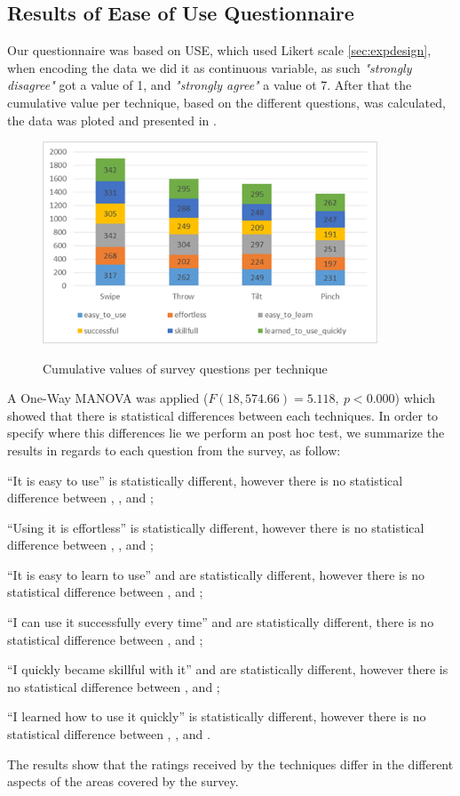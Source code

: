 \subsection{Results of Ease of Use Questionnaire}
Our questionnaire was based on USE, which used Likert scale \ref*{sec:expdesign}, when encoding the data we did it as continuous variable, as such \emph{"strongly disagree"} got a value of 1, and \emph{"strongly agree"} a value ot 7. After that the cumulative value per technique, based on the different questions, was calculated, the data was ploted and presented in . 
\begin{figure}[H]
	{\includegraphics[width = 1\columnwidth , height = 6cm ]{images/survey-data.png}} 
	\caption{
		Cumulative values of survey questions per technique
	}
	\label{fig:surveyResult}
\end{figure}

A One-Way MANOVA was applied ($F(18, 574.66)=5.118,\ p<0.000$) which showed that there is statistical differences between each techniques. 
In order to specify where this differences lie we perform an post hoc test, we summarize the results in regards to each question from the survey, as follow:
\begin{enumerate*}[label=\itshape\arabic*\upshape)]
	\item{``It is easy to use'' \swipe is statistically different, however there is no statistical difference between \throw, \tilt, and \pinch;}
	\item{``Using it is effortless'' \swipe is statistically different, however there is no statistical difference between \throw, \tilt, and \pinch;}
	\item{``It is easy to learn to use''  \swipe and \pinch are statistically different, however there is no statistical difference between \tilt, and \throw;}
	\item{``I can use it successfully every time'' \swipe and \throw are statistically different, there is no statistical difference between \tilt, and \pinch;}
	\item{``I quickly became skillful with it'' \swipe and \throw are statistically different, however there is no statistical difference between \pinch, and \tilt;}
	\item{``I learned how to use it quickly'' \swipe is statistically different, however there is no statistical difference between \throw, \tilt, and \pinch.}
\end{enumerate*}
The results show that the ratings received by the techniques differ in the different aspects of the areas covered by the survey.
